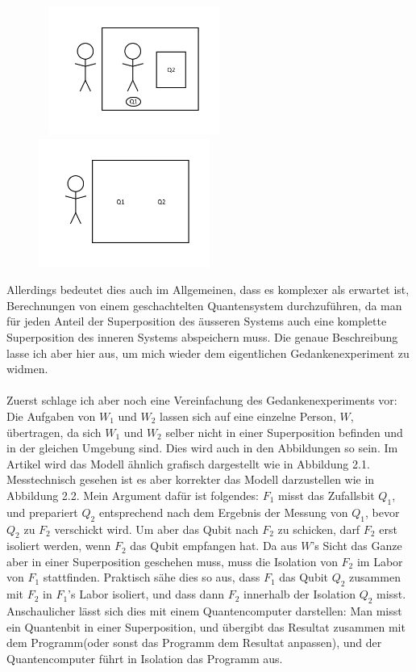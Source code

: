 \documentclass[a4paper]{article}
\begin{document}
\begin{figure}[!htb]
\begin{floatrow}[2]\
%
{\includegraphics[width=0.5\textwidth]{a.png}}
%
%
{\includegraphics[width=0.5\textwidth]{b.png}}
\end{floatrow}
\end{figure}
Allerdings bedeutet dies auch im Allgemeinen, dass es komplexer als erwartet ist, Berechnungen von einem geschachtelten Quantensystem durchzuführen, da man für jeden Anteil der Superposition des äusseren Systems auch eine komplette Superposition des inneren Systems abspeichern muss. Die genaue Beschreibung lasse ich aber hier aus, um mich wieder dem eigentlichen Gedankenexperiment zu widmen.\\\\
Zuerst schlage ich aber noch eine Vereinfachung des Gedankenexperiments vor: Die Aufgaben von $W_1$ und $W_2$ lassen sich auf eine einzelne Person, $W$, übertragen, da sich $W_1$ und $W_2$ selber nicht in einer Superposition befinden und in der gleichen Umgebung sind. Dies wird auch in den Abbildungen so sein. Im Artikel wird das Modell ähnlich grafisch dargestellt wie in Abbildung 2.1. Messtechnisch gesehen ist es aber korrekter das Modell darzustellen wie in Abbildung 2.2. Mein Argument dafür ist folgendes: $F_1$ misst das Zufallsbit $Q_1$, und prepariert $Q_2$ entsprechend nach dem Ergebnis der Messung von $Q_1$, bevor $Q_2$ zu $F_2$ verschickt wird. Um aber das Qubit nach $F_2$ zu schicken, darf $F_2$ erst isoliert werden, wenn $F_2$ das Qubit empfangen hat. Da aus $W$'s Sicht das Ganze aber in einer Superposition geschehen muss, muss die Isolation von $F_2$ im Labor von $F_1$ stattfinden. Praktisch sähe dies so aus, dass $F_1$ das Qubit $Q_2$ zusammen mit $F_2$ in $F_1$'s Labor isoliert, und dass dann $F_2$ innerhalb der Isolation $Q_2$ misst. Anschaulicher lässt sich dies mit einem Quantencomputer darstellen: Man misst ein Quantenbit in einer Superposition, und übergibt das Resultat zusammen mit dem Programm(oder sonst das Programm dem Resultat anpassen), und der Quantencomputer führt in Isolation das Programm aus.
\end{document}
